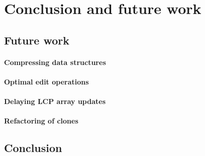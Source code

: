 \chapter{Conclusion and future work}

\section{Future work}

\subsubsection{Compressing data structures}

\subsubsection{Optimal edit operations}

\subsubsection{Delaying LCP array updates}

\subsubsection{Refactoring of clones}

\section{Conclusion}
